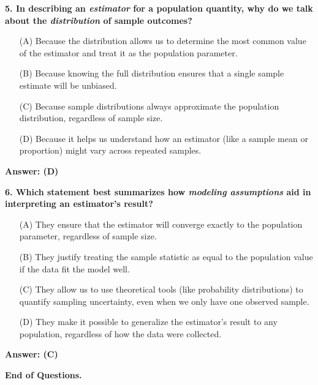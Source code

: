 \documentclass[12pt]{article}
\begin{document}
\bigskip

\textbf{5. In describing an \emph{estimator} for a population quantity, why do we talk about the \emph{distribution} of sample outcomes?}
\begin{enumerate}
\item[(A)] Because the distribution allows us to determine the most common value of the estimator and treat it as the population parameter.
\item[(B)] Because knowing the full distribution ensures that a single sample estimate will be unbiased.
\item[(C)] Because sample distributions always approximate the population distribution, regardless of sample size.
\item[(D)] Because it helps us understand how an estimator (like a sample mean or proportion) might vary across repeated samples.
\end{enumerate}
\textbf{Answer: (D)}

\bigskip

\textbf{6. Which statement best summarizes how \emph{modeling assumptions} aid in interpreting an estimator's result?}
\begin{enumerate}
\item[(A)] They ensure that the estimator will converge exactly to the population parameter, regardless of sample size.
\item[(B)] They justify treating the sample statistic as equal to the population value if the data fit the model well.
\item[(C)] They allow us to use theoretical tools (like probability distributions) to quantify sampling uncertainty, even when we only have one observed sample.
\item[(D)] They make it possible to generalize the estimator’s result to any population, regardless of how the data were collected.
\end{enumerate}
\textbf{Answer: (C)}

\bigskip

\textbf{End of Questions.}
\end{document}
